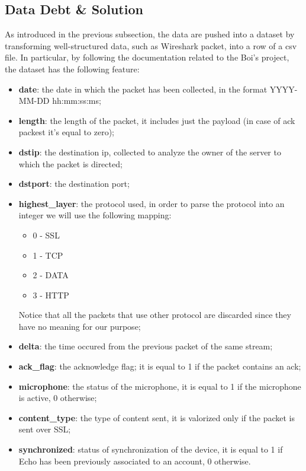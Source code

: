 \documentclass[sigconf]{acmart}
\begin{document}
\subsection{Data Debt \& Solution}
As introduced in the previous subsection, the data are pushed into a dataset by transforming well-structured data, such as Wireshark packet, into a row of a csv file. In particular, by following the documentation related to the Boi's project, the dataset has the following feature:
\begin{itemize}
\item \textbf{date}: the date in which the packet has been collected, in the format YYYY-MM-DD hh:mm:ss:ms;
        \item \textbf{length}: the length of the packet, it includes just the payload (in case of ack packest it's equal to zero);
        \item \textbf{dstip}: the destination ip, collected to analyze the owner of the server to which the packet is directed;
        \item \textbf{dstport}: the destination port;
        \item \textbf{highest\_layer}: the protocol used, in order to parse the protocol into an integer we will use the following mapping:
        \begin{itemize}
            \item 0 - SSL
            \item 1 - TCP
            \item 2 - DATA
            \item 3 - HTTP
        \end{itemize}
        Notice that all the packets that use other protocol are discarded since they have no meaning for our purpose;
        \item \textbf{delta}: the time occured from the previous packet of the same stream;
        \item \textbf{ack\_flag}: the acknowledge flag; it is equal to 1 if the packet contains an ack;
        \item \textbf{microphone}: the status of the microphone, it is equal to 1 if the microphone is active, 0 otherwise;
        \item \textbf{content\_type}: the type of content sent, it is valorized only if the packet is sent over SSL;
        \item \textbf{synchronized}: status of synchronization of the device, it is equal to 1 if Echo has been previously associated to an account, 0 otherwise.
\end{itemize}
\end{document}
